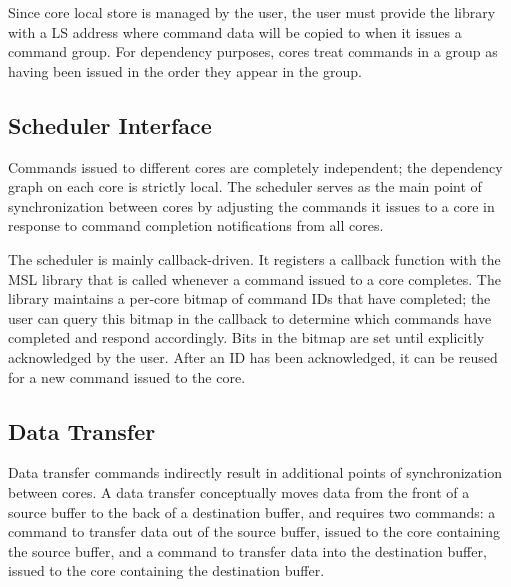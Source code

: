 Since core local store is managed by the user, the user must provide
the library with a LS address where command data will be copied to
when it issues a command group. For dependency purposes, cores treat
commands in a group as having been issued in the order they appear in
the group. 

\subsection{Scheduler Interface}

Commands issued to different cores are completely independent; the
dependency graph on each core is strictly local. The scheduler serves
as the main point of synchronization between cores by adjusting the
commands it issues to a core in response to command completion
notifications from all cores.

The scheduler is mainly callback-driven. It registers a callback
function with the MSL library that is called whenever a command issued
to a core completes. The library maintains a per-core bitmap of
command IDs that have completed; the user can query this bitmap in the
callback to determine which commands have completed and respond
accordingly. Bits in the bitmap are set until explicitly acknowledged
by the user. After an ID has been acknowledged, it can be reused for
a new command issued to the core.



\subsection{Data Transfer}

Data transfer commands indirectly result in additional points of
synchronization between cores. A data transfer conceptually moves
data from the front of a source buffer to the back of a destination
buffer, and requires two commands: a command to transfer data out of
the source buffer, issued to the core containing the source
buffer, and a command to transfer data into the destination buffer,
issued to the core containing the destination buffer. 

